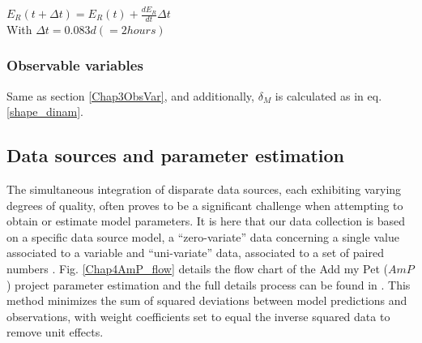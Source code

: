 $E_{R}\left ( t + \Delta t \right ) = E_{R}\left ( t \right ) + \frac{dE_{R}}{dt}\Delta t$ \\

With $\Delta t = 0.083 d \left (=2hours\right )$

\subsubsection{Observable variables}\label{Chap4ObsVar}
Same as section \ref{Chap3ObsVar}, and additionally, $\delta_{M}$ is calculated as in eq. \ref{shape_dinam}.

\subsection{Data sources and parameter estimation}

The simultaneous integration of disparate data sources, each exhibiting varying degrees of quality, often proves to be a significant challenge when attempting to obtain or estimate model parameters. It is here that our data collection is based on a specific data source model, a ``zero-variate'' data concerning a single value associated to a variable and ``uni-variate'' data, associated to a set of paired numbers \citep{MarqLika2019}. Fig. \ref{Chap4AmP_flow} details the flow chart of the Add my Pet ($AmP$) project parameter estimation and the full details process can be found in \cite{MarqAugu2018}. This method minimizes the sum of squared deviations between model predictions and observations, with weight coefficients set to equal the inverse squared data to remove unit effects.\\

